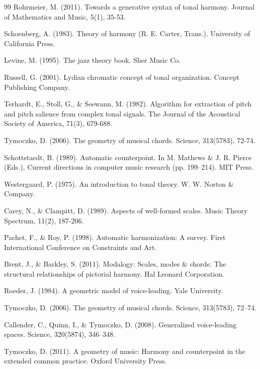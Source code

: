 \documentclass[12pt]{report}
\begin{document}
\begin{thebibliography}{99}
 Rohrmeier, M. (2011). Towards a generative syntax of tonal harmony. Journal of Mathematics and Music, 5(1), 35-53.

 Schoenberg, A. (1983). Theory of harmony (R. E. Carter, Trans.). University of California Press.

 Levine, M. (1995). The jazz theory book. Sher Music Co.

 Russell, G. (2001). Lydian chromatic concept of tonal organization. Concept Publishing Company.

 Terhardt, E., Stoll, G., \& Seewann, M. (1982). Algorithm for extraction of pitch and pitch salience from complex tonal signals. The Journal of the Acoustical Society of America, 71(3), 679-688.

 Tymoczko, D. (2006). The geometry of musical chords. Science, 313(5783), 72-74.

 Schottstaedt, B. (1989). Automatic counterpoint. In M. Mathews \& J. R. Pierce (Eds.), Current directions in computer music research (pp. 199–214). MIT Press.

 Westergaard, P. (1975). An introduction to tonal theory. W. W. Norton \& Company.

 Carey, N., \& Clampitt, D. (1989). Aspects of well-formed scales. Music Theory Spectrum, 11(2), 187-206.

 Pachet, F., \& Roy, P. (1998). Automatic harmonization: A survey. First International Conference on Constraints and Art.

 Brent, J., \& Barkley, S. (2011). Modalogy: Scales, modes \& chords: The structural relationships of pictorial harmony. Hal Leonard Corporation.

 Roeder, J. (1984). A geometric model of voice-leading. Yale University.

 Tymoczko, D. (2006). The geometry of musical chords. Science, 313(5783), 72–74.

 Callender, C., Quinn, I., \& Tymoczko, D. (2008). Generalized voice-leading spaces. Science, 320(5874), 346–348.

 Tymoczko, D. (2011). A geometry of music: Harmony and counterpoint in the extended common practice. Oxford University Press.


\end{thebibliography}
\end{document}
